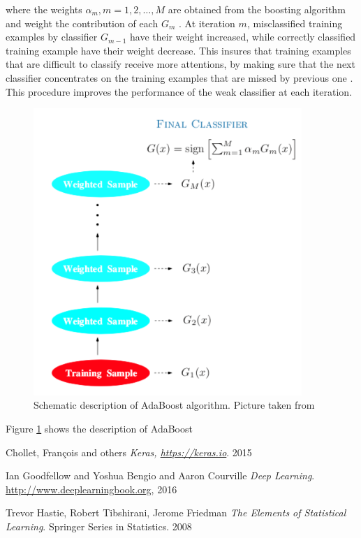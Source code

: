 \documentclass[11pt, oneside]{article}   	%
\begin{document}
where the weights $\alpha_{m}, m = 1,2,\dots, M$ are obtained from the boosting algorithm and weight the contribution of each $G_{m}$ \cite{trevor}. At iteration $m$, misclassified training examples by classifier $G_{m-1}$ have their weight increased, while correctly classified training example have their weight decrease. This insures that training examples that are difficult to classify receive more attentions, by making sure that the next classifier concentrates on the training examples that are missed by previous one \cite{trevor}. This procedure improves the performance of the weak classifier at each iteration.
\begin{figure}[H] %
   \centering
   \includegraphics[width=4in]{adaboost.png} 
   \caption{Schematic description of AdaBoost algorithm. Picture taken from \cite{trevor}}
   \label{fig:adaboost}
\end{figure}
Figure \ref{fig:adaboost} shows the description of AdaBoost







\medskip
\begin{thebibliography}{9}
Chollet, Fran\c{c}ois and others
\textit{Keras, \url{https://keras.io}}. 
2015


Ian Goodfellow and Yoshua Bengio and Aaron Courville
\textit{Deep Learning}. 
\url{http://www.deeplearningbook.org}, 2016

Trevor Hastie, Robert Tibshirani, Jerome Friedman
\textit{The Elements of Statistical Learning}. 
Springer Series in Statistics. 2008






 
\end{thebibliography}
\end{document}
